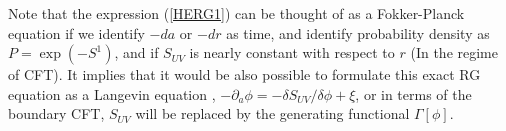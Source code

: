 \documentclass[12pt,epsbox]{article}
\numberwithin{equation}{section}
\begin{document}

Note that the expression (\ref{HERG1}) can be thought of as a Fokker-Planck equation if we identify $-da$ or $-dr$ as time, and identify probability density as $P= \exp(-S^1)$, and if $S_{UV}$ is nearly constant with respect to $r$ (In the regime of CFT). It implies that it would be also possible to formulate this exact RG equation as a Langevin equation \cite{Gaite}, $ -\partial_a \phi= -\delta S_{UV} / \delta \phi + \xi $, or in terms of the boundary CFT, $S_{UV}$ will be replaced by the generating functional $\Gamma[\phi]$.
\end{document}
